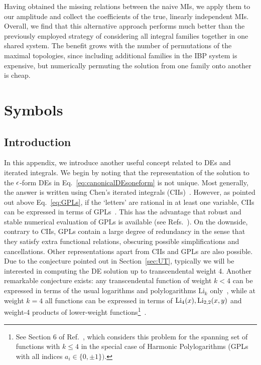\documentclass[main.tex]{subfiles}
\begin{document}
Having obtained the missing relations between the naive MIs, we apply them to our amplitude and collect the coefficients of the true, linearly independent MIs. Overall, we find that this alternative approach performs much better than the previously employed strategy of considering all integral families together in one shared system. The benefit grows with the number of permutations of the maximal topologies, since including additional families in the IBP system is expensive, but numerically permuting the solution from one family onto another is cheap.

\renewcommand{\theequation}{B.\arabic{section}.\arabic{equation}}
\chapter{Symbols} \label{app:symbols}
\section{Introduction}
In this appendix, we introduce another useful concept related to DEs and iterated integrals. We begin by noting that the representation of the solution to the $\epsilon$-form DEs in Eq.~\ref{eq:canonicalDEsoneform} is not unique. Most generally, the answer is written using Chen's iterated integrals (CIIs)~\cite{Chen:1977oja}. However, as pointed out above Eq.~\ref{eq:GPLs}, if the `letters' are rational in at least one variable, CIIs can be expressed in terms of GPLs~\cite{Henn:2014qga}. This has the advantage that robust and stable numerical evaluation of GPLs is available (see Refs.~\cite{Bauer:2000cp, Vollinga:2004sn, Panzer:2014caa}). On the downside, contrary to CIIs, GPLs contain a large degree of redundancy in the sense that they satisfy extra functional relations, obscuring possible simplifications and cancellations. Other representations apart from CIIs and GPLs are also possible. Due to the conjecture pointed out in Section~\ref{sec:UT}, typically we will be interested in computing the DE solution up to transcendental weight 4. Another remarkable conjecture exists: any transcendental function of weight $k < 4$ can be expressed in terms of the usual logarithms and polylogarithms $\text{Li}_k$ only~\cite{MR1265551, Goncharov:2010jf}, while at weight $k=4$ all functions can be expressed in terms of $\text{Li}_4(x), \text{Li}_{2,2}(x,y)$ and weight-4 products of lower-weight functions\footnote{See Section 6 of Ref.~\cite{Duhr:2011zq}, which considers this problem for the spanning set of functions with $k\le4$ in the special case of Harmonic Polylogarithms (GPLs with all indices $a_i\in\{0,\pm1\})$.}~\cite{Henn:2014qga}. 
\end{document}
